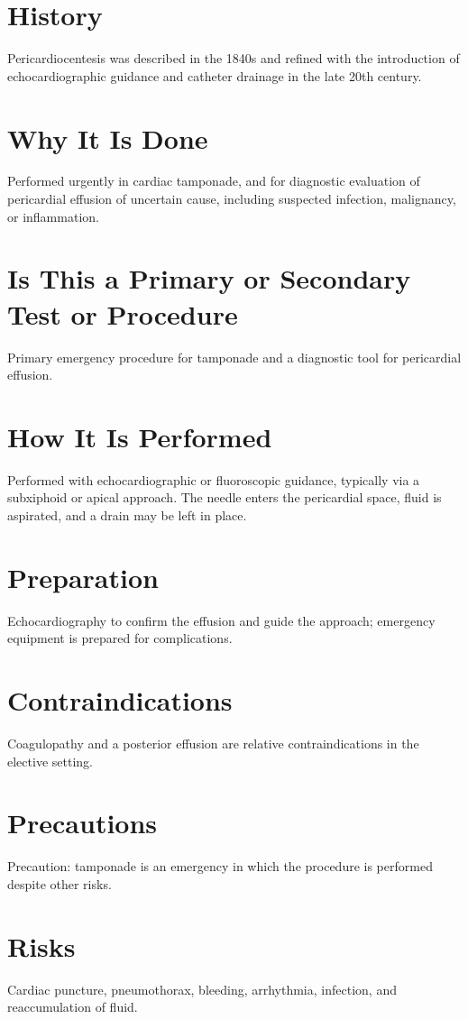 \section*{History}
Pericardiocentesis was described in the 1840s and refined with the introduction of echocardiographic guidance and catheter drainage in the late 20th century.

\section*{Why It Is Done}
Performed urgently in cardiac tamponade, and for diagnostic evaluation of pericardial effusion of uncertain cause, including suspected infection, malignancy, or inflammation.

\section*{Is This a Primary or Secondary Test or Procedure}
Primary emergency procedure for tamponade and a diagnostic tool for pericardial effusion.

\section*{How It Is Performed}
Performed with echocardiographic or fluoroscopic guidance, typically via a subxiphoid or apical approach. The needle enters the pericardial space, fluid is aspirated, and a drain may be left in place.

\section*{Preparation}
Echocardiography to confirm the effusion and guide the approach; emergency equipment is prepared for complications.

\section*{Contraindications}
Coagulopathy and a posterior effusion are relative contraindications in the elective setting.

\section*{Precautions}
Precaution: tamponade is an emergency in which the procedure is performed despite other risks.

\section*{Risks}
Cardiac puncture, pneumothorax, bleeding, arrhythmia, infection, and reaccumulation of fluid.

